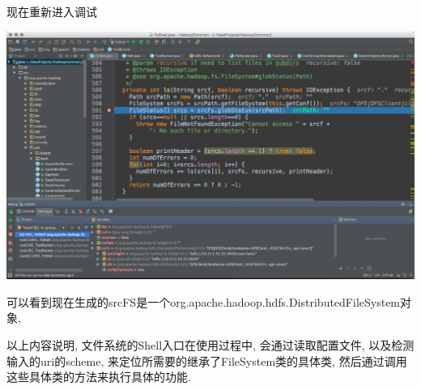现在重新进入调试

\includegraphics[width=\textwidth]{image/env/cr42.png}

可以看到现在生成的srcFS是一个org.apache.hadoop.hdfs.DistributedFileSystem对象,


以上内容说明, {\Hadoop}文件系统的Shell入口在使用过程中, 会通过读取配置文件,
以及检测输入的uri的scheme, 来定位所需要的继承了FileSystem类的具体类,
然后通过调用这些具体类的方法来执行具体的功能.
